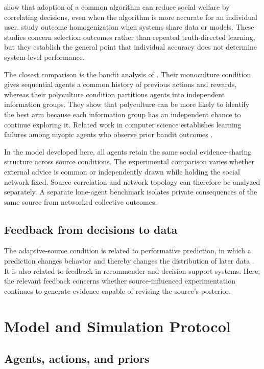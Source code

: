 \documentclass[10pt,letterpaper,twocolumn]{article}
\begin{document}
\citet{kleinberg2021} show that adoption of a common algorithm can reduce social welfare by correlating decisions, even when the algorithm is more accurate for an individual user. \citet{bommasani2022} study outcome homogenization when systems share data or models. These studies concern selection outcomes rather than repeated truth-directed learning, but they establish the general point that individual accuracy does not determine system-level performance.

The closest comparison is the bandit analysis of \citet{heddenraghavan2026}. Their monoculture condition gives sequential agents a common history of previous actions and rewards, whereas their polyculture condition partitions agents into independent information groups. They show that polyculture can be more likely to identify the best arm because each information group has an independent chance to continue exploring it. Related work in computer science establishes learning failures among myopic agents who observe prior bandit outcomes \citep{banihashem2023}.

In the model developed here, all agents retain the same social evidence-sharing structure across source conditions. The experimental comparison varies whether external advice is common or independently drawn while holding the social network fixed. Source correlation and network topology can therefore be analyzed separately. A separate lone-agent benchmark isolates private consequences of the same source from networked collective outcomes.

\subsection{Feedback from decisions to data}

The adaptive-source condition is related to performative prediction, in which a prediction changes behavior and thereby changes the distribution of later data \citep{perdomo2020}. It is also related to feedback in recommender and decision-support systems. Here, the relevant feedback concerns whether source-influenced experimentation continues to generate evidence capable of revising the source's posterior.

\section{Model and Simulation Protocol}
\label{sec:model}

\subsection{Agents, actions, and priors}
\label{sec:agents}
\end{document}
